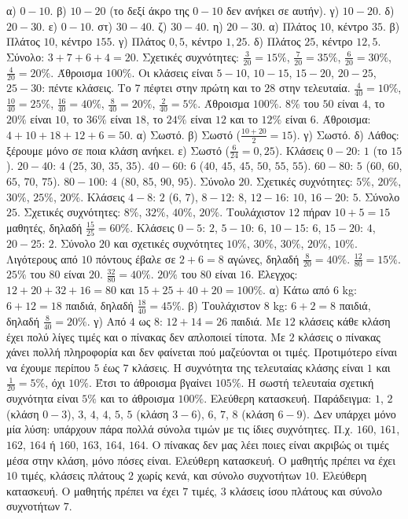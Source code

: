  α) $0-10$. β) $10-20$ (το δεξί άκρο της $0-10$ δεν ανήκει σε αυτήν). γ) $10-20$. δ) $20-30$. ε) $0-10$. στ) $30-40$. ζ) $30-40$. η) $20-30$.
 α) Πλάτος $10$, κέντρο $35$. β) Πλάτος $10$, κέντρο $155$. γ) Πλάτος $0{,}5$, κέντρο $1{,}25$. δ) Πλάτος $25$, κέντρο $12{,}5$.
 Σύνολο: $3+7+6+4=20$. Σχετικές συχνότητες: $\frac{3}{20}=15\%$, $\frac{7}{20}=35\%$, $\frac{6}{20}=30\%$, $\frac{4}{20}=20\%$. Άθροισμα $100\%$.
 Οι κλάσεις είναι $5-10$, $10-15$, $15-20$, $20-25$, $25-30$: πέντε κλάσεις. Το $7$ πέφτει στην πρώτη και το $28$ στην τελευταία.
 $\frac{4}{40}=10\%$, $\frac{10}{40}=25\%$, $\frac{16}{40}=40\%$, $\frac{8}{40}=20\%$, $\frac{2}{40}=5\%$. Άθροισμα $100\%$.
 $8\%$ του $50$ είναι $4$, το $20\%$ είναι $10$, το $36\%$ είναι $18$, το $24\%$ είναι $12$ και το $12\%$ είναι $6$. Άθροισμα: $4+10+18+12+6=50$.
 α) Σωστό. β) Σωστό ($\frac{10+20}{2}=15$). γ) Σωστό. δ) Λάθος: ξέρουμε μόνο σε ποια κλάση ανήκει. ε) Σωστό ($\frac{6}{24}=0{,}25$).
 Κλάσεις $0-20$: $1$ (το $15$). $20-40$: $4$ ($25$, $30$, $35$, $35$). $40-60$: $6$ ($40$, $45$, $45$, $50$, $55$, $55$). $60-80$: $5$ ($60$, $60$, $65$, $70$, $75$). $80-100$: $4$ ($80$, $85$, $90$, $95$). Σύνολο $20$. Σχετικές συχνότητες: $5\%$, $20\%$, $30\%$, $25\%$, $20\%$.
 Κλάσεις $4-8$: $2$ ($6$, $7$), $8-12$: $8$, $12-16$: $10$, $16-20$: $5$. Σύνολο $25$. Σχετικές συχνότητες: $8\%$, $32\%$, $40\%$, $20\%$. Τουλάχιστον $12$ πήραν $10+5=15$ μαθητές, δηλαδή $\frac{15}{25}=60\%$.
 Κλάσεις $0-5$: $2$, $5-10$: $6$, $10-15$: $6$, $15-20$: $4$, $20-25$: $2$. Σύνολο $20$ και σχετικές συχνότητες $10\%$, $30\%$, $30\%$, $20\%$, $10\%$. Λιγότερους από $10$ πόντους έβαλε σε $2+6=8$ αγώνες, δηλαδή $\frac{8}{20}=40\%$.
 $\frac{12}{80}=15\%$. $25\%$ του $80$ είναι $20$. $\frac{32}{80}=40\%$. $20\%$ του $80$ είναι $16$. Έλεγχος: $12+20+32+16=80$ και $15+25+40+20=100\%$.
 α) Κάτω από $6$ kg: $6+12=18$ παιδιά, δηλαδή $\frac{18}{40}=45\%$. β) Τουλάχιστον $8$ kg: $6+2=8$ παιδιά, δηλαδή $\frac{8}{40}=20\%$. γ) Από $4$ ως $8$: $12+14=26$ παιδιά.
 Με $12$ κλάσεις κάθε κλάση έχει πολύ λίγες τιμές και ο πίνακας δεν απλοποιεί τίποτα. Με $2$ κλάσεις ο πίνακας χάνει πολλή πληροφορία και δεν φαίνεται πού μαζεύονται οι τιμές. Προτιμότερο είναι να έχουμε περίπου $5$ έως $7$ κλάσεις.
 Η συχνότητα της τελευταίας κλάσης είναι $1$ και $\frac{1}{20}=5\%$, όχι $10\%$. Έτσι το άθροισμα βγαίνει $105\%$. Η σωστή τελευταία σχετική συχνότητα είναι $5\%$ και το άθροισμα $100\%$.
 Ελεύθερη κατασκευή. Παράδειγμα: $1$, $2$ (κλάση $0-3$), $3$, $4$, $4$, $5$, $5$ (κλάση $3-6$), $6$, $7$, $8$ (κλάση $6-9$). Δεν υπάρχει μόνο μία λύση: υπάρχουν πάρα πολλά σύνολα τιμών με τις ίδιες συχνότητες.
 Π.χ. $160$, $161$, $162$, $164$ ή $160$, $163$, $164$, $164$. Ο πίνακας δεν μας λέει ποιες είναι ακριβώς οι τιμές μέσα στην κλάση, μόνο πόσες είναι.
 Ελεύθερη κατασκευή. Ο μαθητής πρέπει να έχει $10$ τιμές, κλάσεις πλάτους $2$ χωρίς κενά, και σύνολο συχνοτήτων $10$.
 Ελεύθερη κατασκευή. Ο μαθητής πρέπει να έχει $7$ τιμές, $3$ κλάσεις ίσου πλάτους και σύνολο συχνοτήτων $7$.
